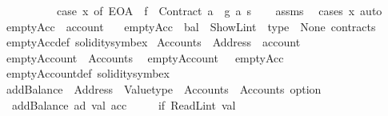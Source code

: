 \begin{isabellebody}
\ \ \ \ \ \ \ \ \ {\isacharequal}{\kern0pt}\ {\isacharparenleft}{\kern0pt}case\ x{\isacharprime}{\kern0pt}\ of\ EOA\ {\isasymRightarrow}\ f{\isacharprime}{\kern0pt}\ {\isacharbar}{\kern0pt}\ Contract\ a\ {\isasymRightarrow}\ g{\isacharprime}{\kern0pt}\ a{\isacharparenright}{\kern0pt}\ s{\isachardoublequoteclose}\isanewline
%
\isadelimproof
\ \ %
\endisadelimproof
%
\isatagproof
{}\isamarkupfalse%
\ assms\ \isamarkupfalse%
\ {\isacharparenleft}{\kern0pt}cases\ x{\isacharcomma}{\kern0pt}\ auto{\isacharparenright}{\kern0pt}%
\endisatagproof
{\isafoldproof}%
%
\isadelimproof
\isanewline
%
\endisadelimproof
\isanewline
{}\isamarkupfalse%
\ emptyAcc\ {\isacharcolon}{\kern0pt}{\isacharcolon}{\kern0pt}\ account\isanewline
\ \ \ {\isachardoublequoteopen}emptyAcc\ {\isacharequal}{\kern0pt}\ {\isasymlparr}bal\ {\isacharequal}{\kern0pt}\ ShowL\isactrlsub i\isactrlsub n\isactrlsub t\ {}{\isacharcomma}{\kern0pt}\ type\ {\isacharequal}{\kern0pt}\ None{\isacharcomma}{\kern0pt}\ contracts\ {\isacharequal}{\kern0pt}\ {}{\isasymrparr}{\isachardoublequoteclose}\isanewline
\isanewline
{}\isamarkupfalse%
\ emptyAcc{\isacharunderscore}{\kern0pt}def\ {\isacharbrackleft}{\kern0pt}solidity{\isacharunderscore}{\kern0pt}symbex{\isacharbrackright}{\kern0pt}\isanewline
\isanewline
{}\isamarkupfalse%
\ Accounts\ {\isacharequal}{\kern0pt}\ {\isachardoublequoteopen}Address\ {\isasymRightarrow}\ account{\isachardoublequoteclose}\isanewline
\isanewline
{}\isamarkupfalse%
\ emptyAccount\ {\isacharcolon}{\kern0pt}{\isacharcolon}{\kern0pt}\ {\isachardoublequoteopen}Accounts{\isachardoublequoteclose}\isanewline
{}\isanewline
\ \ {\isachardoublequoteopen}emptyAccount\ {\isacharunderscore}{\kern0pt}\ {\isacharequal}{\kern0pt}\ emptyAcc{\isachardoublequoteclose}\isanewline
\isanewline
{}\isamarkupfalse%
\ emptyAccount{\isacharunderscore}{\kern0pt}def\ {\isacharbrackleft}{\kern0pt}solidity{\isacharunderscore}{\kern0pt}symbex{\isacharbrackright}{\kern0pt}\isanewline
\isanewline
{}\isamarkupfalse%
\ addBalance\ {\isacharcolon}{\kern0pt}{\isacharcolon}{\kern0pt}\ {\isachardoublequoteopen}Address\ {\isasymRightarrow}\ Valuetype\ {\isasymRightarrow}\ Accounts\ {\isasymRightarrow}\ Accounts\ option{\isachardoublequoteclose}\isanewline
{}\isanewline
\ \ {\isachardoublequoteopen}addBalance\ ad\ val\ acc\ {\isacharequal}{\kern0pt}\isanewline
\ \ \ \ {\isacharparenleft}{\kern0pt}if\ ReadL\isactrlsub i\isactrlsub n\isactrlsub t\ val\ {\isasymge}\ {}\isanewline

\end{isabellebody}
